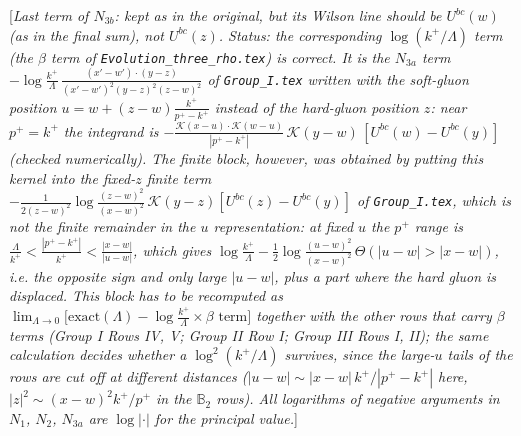 \documentclass[9pt]{article}
\def\mf#1{\mathbb{#1}}
\newcommand{\rnote}[1]{{\color{teal}[\textit{#1}]}}
\numberwithin{equation}{section}
\begin{document}
\rnote{Last term of $N_{3b}$: kept as in the original, but its Wilson line should be $U^{bc}(w)$ (as in the final sum), not $U^{bc}(z)$. Status: the corresponding $\log(k^{+}/\Lambda)$ term (the $\beta$ term of \texttt{Evolution\_three\_rho.tex}) is correct. It is the $N_{3a}$ term $-\log\frac{k^{+}}{\Lambda}\,\frac{(x'-w')\cdot(y-z)}{(x'-w')^{2}(y-z)^{2}(z-w)^{2}}$ of \texttt{Group\_I.tex} written with the soft-gluon position $u=w+(z-w)\frac{k^{+}}{p^{+}-k^{+}}$ instead of the hard-gluon position $z$: near $p^{+}=k^{+}$ the integrand is $-\frac{\mathcal{K}(x-u)\cdot\mathcal{K}(w-u)}{|p^{+}-k^{+}|}\,\mathcal{K}(y-w)\,[U^{bc}(w)-U^{bc}(y)]$ (checked numerically). The finite block, however, was obtained by putting this kernel into the fixed-$z$ finite term $-\frac{1}{2(z-w)^{2}}\log\frac{(z-w)^{2}}{(x-w)^{2}}\,\mathcal{K}(y-z)[U^{bc}(z)-U^{bc}(y)]$ of \texttt{Group\_I.tex}, which is not the finite remainder in the $u$ representation: at fixed $u$ the $p^{+}$ range is $\frac{\Lambda}{k^{+}}<\frac{|p^{+}-k^{+}|}{k^{+}}<\frac{|x-w|}{|u-w|}$, which gives $\log\frac{k^{+}}{\Lambda}-\frac12\log\frac{(u-w)^{2}}{(x-w)^{2}}\,\Theta(|u-w|>|x-w|)$, i.e. the opposite sign and only large $|u-w|$, plus a part where the hard gluon is displaced. This block has to be recomputed as $\lim_{\Lambda\to0}\big[\text{exact}(\Lambda)-\log\frac{k^{+}}{\Lambda}\times\beta\text{ term}\big]$ together with the other rows that carry $\beta$ terms (Group I Rows IV, V; Group II Row I; Group III Rows I, II); the same calculation decides whether a $\log^{2}(k^{+}/\Lambda)$ survives, since the large-$u$ tails of the rows are cut off at different distances ($|u-w|\sim|x-w|\,k^{+}/|p^{+}-k^{+}|$ here, $|z|^{2}\sim(x-w)^{2}k^{+}/p^{+}$ in the $\mf{B}_{2}$ rows). All logarithms of negative arguments in $N_{1}$, $N_{2}$, $N_{3a}$ are $\log|\cdot|$ for the principal value.}
\end{document}

